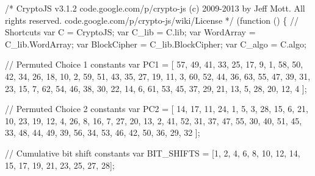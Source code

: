\begin{DoxyCodeInclude}
\textcolor{comment}{/*}
\textcolor{comment}{CryptoJS v3.1.2}
\textcolor{comment}{code.google.com/p/crypto-js}
\textcolor{comment}{(c) 2009-2013 by Jeff Mott. All rights reserved.}
\textcolor{comment}{code.google.com/p/crypto-js/wiki/License}
\textcolor{comment}{*/}
(\textcolor{keyword}{function} () \{
    \textcolor{comment}{// Shortcuts}
    var C = CryptoJS;
    var C\_lib = C.lib;
    var WordArray = C\_lib.WordArray;
    var BlockCipher = C\_lib.BlockCipher;
    var C\_algo = C.algo;

    \textcolor{comment}{// Permuted Choice 1 constants}
    var PC1 = [
        57, 49, 41, 33, 25, 17, 9,  1,
        58, 50, 42, 34, 26, 18, 10, 2,
        59, 51, 43, 35, 27, 19, 11, 3,
        60, 52, 44, 36, 63, 55, 47, 39,
        31, 23, 15, 7,  62, 54, 46, 38,
        30, 22, 14, 6,  61, 53, 45, 37,
        29, 21, 13, 5,  28, 20, 12, 4
    ];

    \textcolor{comment}{// Permuted Choice 2 constants}
    var PC2 = [
        14, 17, 11, 24, 1,  5,
        3,  28, 15, 6,  21, 10,
        23, 19, 12, 4,  26, 8,
        16, 7,  27, 20, 13, 2,
        41, 52, 31, 37, 47, 55,
        30, 40, 51, 45, 33, 48,
        44, 49, 39, 56, 34, 53,
        46, 42, 50, 36, 29, 32
    ];

    \textcolor{comment}{// Cumulative bit shift constants}
    var BIT\_SHIFTS = [1,  2,  4,  6,  8,  10, 12, 14, 15, 17, 19, 21, 23, 25, 27, 28];


\end{DoxyCodeInclude}
